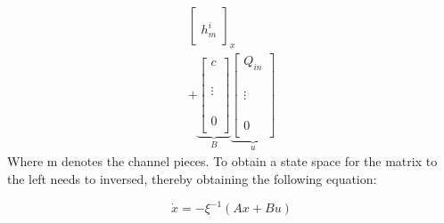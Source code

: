 \begin{equation}
\begin{aligned}
{\begin{bmatrix}
					\\
					\\
		h_{m}^{i}\\
		\end{bmatrix}}_{x}
		\\
	+ \underbrace{\begin{bmatrix}
		c \\
		\\
					\\
					\\
		\vdots		\\
					\\
					\\
					\\
		0\\
		\end{bmatrix}}_{B}
		\underbrace{\begin{bmatrix}
		Q_{in} \\
		\\
					\\
					\\
		\vdots		\\
					\\
					\\
					\\
		0\\
		\end{bmatrix}}_{u}
	\end{aligned}
\end{equation}
Where m denotes the channel pieces.  
To obtain a state space for the matrix to the left needs to inversed, thereby obtaining the following equation:

\begin{equation}
	\dot{x} = -\xi^{-1} (Ax+Bu)
\end{equation}


